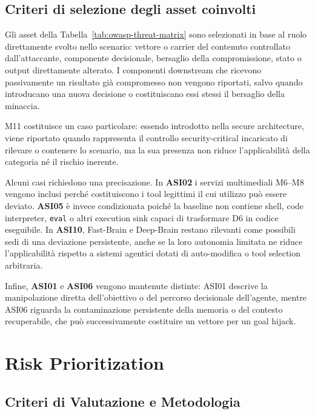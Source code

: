 \documentclass[11pt,a4paper]{article}
\begin{document}
\subsection{Criteri di selezione degli asset coinvolti}
\label{subsec:owasp-assets-explanation}

Gli asset della Tabella~\ref{tab:owasp-threat-matrix} sono selezionati
in base al ruolo direttamente svolto nello scenario: vettore o carrier
del contenuto controllato dall'attaccante, componente decisionale,
bersaglio della compromissione, stato o output direttamente alterato.
I componenti downstream che ricevono passivamente un risultato già
compromesso non vengono riportati, salvo quando introducano una nuova
decisione o costituiscano essi stessi il bersaglio della minaccia.

M11 costituisce un caso particolare: essendo introdotto nella secure
architecture, viene riportato quando rappresenta il controllo
security-critical incaricato di rilevare o contenere lo scenario, ma
la sua presenza non riduce l'applicabilità della categoria né il
rischio inerente.

Alcuni casi richiedono una precisazione. In \textbf{ASI02} i servizi
multimediali M6--M8 vengono inclusi perché costituiscono i tool
legittimi il cui utilizzo può essere deviato. \textbf{ASI05} è invece
condizionata poiché la baseline non contiene shell, code interpreter,
\texttt{eval} o altri execution sink capaci di trasformare D6 in
codice eseguibile. In \textbf{ASI10}, Fast-Brain e Deep-Brain restano
rilevanti come possibili sedi di una deviazione persistente, anche se
la loro autonomia limitata ne riduce l'applicabilità rispetto a sistemi
agentici dotati di auto-modifica o tool selection arbitraria.

Infine, \textbf{ASI01} e \textbf{ASI06} vengono mantenute distinte:
ASI01 descrive la manipolazione diretta dell'obiettivo o del percorso
decisionale dell'agente, mentre ASI06 riguarda la contaminazione
persistente della memoria o del contesto recuperabile, che può
successivamente costituire un vettore per un goal hijack.
\section{Risk Prioritization}
\label{sec:risk-prioritization}

\subsection{Criteri di Valutazione e Metodologia}
\end{document}
